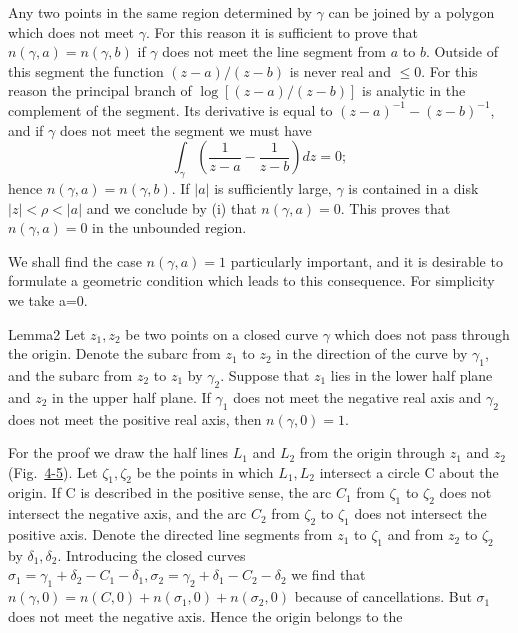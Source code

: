 Any two points in the same region determined by $\gamma$ can be joined by a polygon which does not meet $\gamma$. For this reason it is sufficient to prove that $n(\gamma, a) = n(\gamma, b)$ if $\gamma$ does not meet the line segment from $a$ to $b$. Outside of this segment the function $(z - a)/(z - b)$ is never real and $\leq 0$. For this reason the principal branch of $\log [(z - a)/(z - b)]$ is analytic in the complement of the segment. Its derivative is equal to $(z - a)^{-1} - (z - b)^{-1}$, and if $\gamma$ does not meet the segment we must have
\begin{equation*}
\int_ {\gamma} \left(\frac {1}{z - a} - \frac {1}{z - b}\right) d z = 0;
\end{equation*}
hence $n(\gamma, a) = n(\gamma, b)$. If $|a|$ is sufficiently large, $\gamma$ is contained in a disk $|z| < \rho < |a|$ and we conclude by (i) that $n(\gamma, a) = 0$. This proves that $n(\gamma, a) = 0$ in the unbounded region.

We shall find the case $n(\gamma,a)=1$ particularly important, and it is desirable to formulate a geometric condition which leads to this consequence. For simplicity we take a=0.

\begin{originalstatement}{Lemma}{2}\label{lem:4.2}
Let $z_1, z_2$ be two points on a closed curve $\gamma$ which does not pass through the origin. Denote the subarc from $z_1$ to $z_2$ in the direction of the curve by $\gamma_1$, and the subarc from $z_2$ to $z_1$ by $\gamma_2$. Suppose that $z_1$ lies in the lower half plane and $z_2$ in the upper half plane. If $\gamma_1$ does not meet the negative real axis and $\gamma_2$ does not meet the positive real axis, then $n(\gamma,0) = 1$.
\end{originalstatement}
For the proof we draw the half lines $L_{1}$ and $L_{2}$ from the origin through $z_{1}$ and $z_{2}$ (Fig.~\hyperref[fig:4-5]{4-5}). Let $\zeta_{1}, \zeta_{2}$ be the points in which $L_{1}, L_{2}$ intersect a circle C about the origin. If C is described in the positive sense, the arc $C_{1}$ from $\zeta_{1}$ to $\zeta_{2}$ does not intersect the negative axis, and the arc $C_{2}$ from $\zeta_{2}$ to $\zeta_{1}$ does not intersect the positive axis. Denote the directed line segments from $z_{1}$ to $\zeta_{1}$ and from $z_{2}$ to $\zeta_{2}$ by $\delta_{1}, \delta_{2}$. Introducing the closed curves $\sigma_{1} = \gamma_{1} + \delta_{2} - C_{1} - \delta_{1}, \sigma_{2} = \gamma_{2} + \delta_{1} - C_{2} - \delta_{2}$ we find that $n(\gamma,0) = n(C,0) + n(\sigma_{1},0) + n(\sigma_{2},0)$ because of cancellations. But $\sigma_{1}$ does not meet the negative axis. Hence the origin belongs to the


